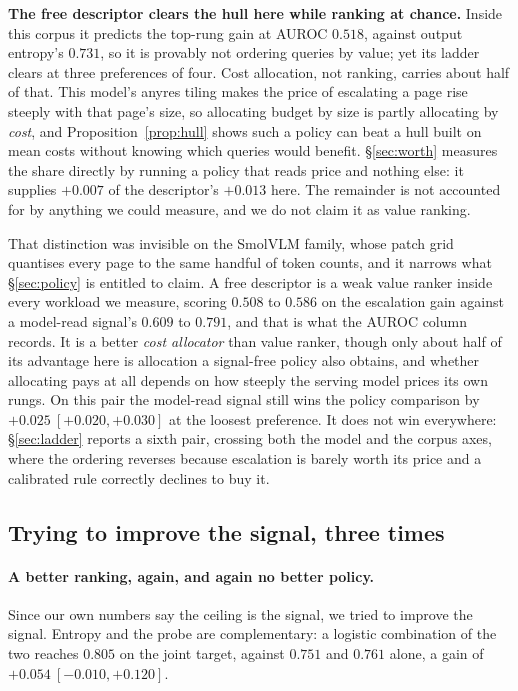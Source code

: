 \documentclass[10pt,twocolumn]{article}
\theoremstyle{plain}
\begin{document}
\textbf{The free descriptor clears the hull here while ranking at chance.}
Inside this corpus it predicts the top-rung gain at AUROC $0.518$, against
output entropy's $0.731$, so it is provably not ordering queries by value; yet
its ladder clears at three preferences of four. Cost allocation, not ranking,
carries about half of that. This model's anyres tiling makes the price of
escalating a page rise steeply with that page's size, so allocating budget by
size is partly allocating by \emph{cost}, and Proposition~\ref{prop:hull} shows such a policy
can beat a hull built on mean costs without knowing which queries would
benefit. \S\ref{sec:worth} measures the share directly by running a policy that
reads price and nothing else: it supplies $+0.007$ of the descriptor's
$+0.013$ here. The remainder is not accounted for by anything we could
measure, and we do not claim it as value ranking.

That distinction was invisible on the SmolVLM family, whose patch grid
quantises every page to the same handful of token counts, and it narrows what
\S\ref{sec:policy} is entitled to claim. A free descriptor is a weak value ranker inside every
workload we measure, scoring $0.508$ to $0.586$ on the escalation gain against
a model-read signal's $0.609$ to $0.791$, and that is what the AUROC column
records. It is a better \emph{cost allocator} than value ranker, though only about half
of its advantage here is allocation a signal-free policy also obtains, and
whether allocating pays at all depends on how steeply the serving model prices
its own rungs. On this pair the
model-read signal still wins the policy comparison by
$+0.025\ [+0.020, +0.030]$ at the loosest preference. It does not win
everywhere: \S\ref{sec:ladder} reports a sixth pair, crossing both the model
and the corpus axes, where the ordering reverses because escalation is barely
worth its price and a calibrated rule correctly declines to buy it.

\subsection{Trying to improve the signal, three times}

\paragraph{A better ranking, again, and again no better policy.} Since our own
numbers say the ceiling is the signal, we tried to improve the signal. Entropy
and the probe are complementary: a logistic combination of the two reaches
$0.805$ on the joint target, against $0.751$ and $0.761$ alone, a gain of
$+0.054\ [-0.010, +0.120]$.
\end{document}

